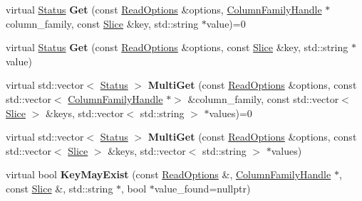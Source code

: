 \begin{DoxyCompactItemize}
\item 
virtual \hyperlink{classrocksdb_1_1Status}{Status} {\bfseries Get} (const \hyperlink{structrocksdb_1_1ReadOptions}{Read\+Options} \&options, \hyperlink{classrocksdb_1_1ColumnFamilyHandle}{Column\+Family\+Handle} $\ast$column\+\_\+family, const \hyperlink{classrocksdb_1_1Slice}{Slice} \&key, std\+::string $\ast$value)=0\hypertarget{classrocksdb_1_1DB_a53885ea9306b14be2385ca8a9e664b5f}{}\label{classrocksdb_1_1DB_a53885ea9306b14be2385ca8a9e664b5f}

\item 
virtual \hyperlink{classrocksdb_1_1Status}{Status} {\bfseries Get} (const \hyperlink{structrocksdb_1_1ReadOptions}{Read\+Options} \&options, const \hyperlink{classrocksdb_1_1Slice}{Slice} \&key, std\+::string $\ast$value)\hypertarget{classrocksdb_1_1DB_ad04ed2bb886fbfb5c97af2dc3e88d8b0}{}\label{classrocksdb_1_1DB_ad04ed2bb886fbfb5c97af2dc3e88d8b0}

\item 
virtual std\+::vector$<$ \hyperlink{classrocksdb_1_1Status}{Status} $>$ {\bfseries Multi\+Get} (const \hyperlink{structrocksdb_1_1ReadOptions}{Read\+Options} \&options, const std\+::vector$<$ \hyperlink{classrocksdb_1_1ColumnFamilyHandle}{Column\+Family\+Handle} $\ast$$>$ \&column\+\_\+family, const std\+::vector$<$ \hyperlink{classrocksdb_1_1Slice}{Slice} $>$ \&keys, std\+::vector$<$ std\+::string $>$ $\ast$values)=0\hypertarget{classrocksdb_1_1DB_a5809d34b7cb788825fc65991c95a2d64}{}\label{classrocksdb_1_1DB_a5809d34b7cb788825fc65991c95a2d64}

\item 
virtual std\+::vector$<$ \hyperlink{classrocksdb_1_1Status}{Status} $>$ {\bfseries Multi\+Get} (const \hyperlink{structrocksdb_1_1ReadOptions}{Read\+Options} \&options, const std\+::vector$<$ \hyperlink{classrocksdb_1_1Slice}{Slice} $>$ \&keys, std\+::vector$<$ std\+::string $>$ $\ast$values)\hypertarget{classrocksdb_1_1DB_a608e457908d203043d7d6756ab58d5ef}{}\label{classrocksdb_1_1DB_a608e457908d203043d7d6756ab58d5ef}

\item 
virtual bool {\bfseries Key\+May\+Exist} (const \hyperlink{structrocksdb_1_1ReadOptions}{Read\+Options} \&, \hyperlink{classrocksdb_1_1ColumnFamilyHandle}{Column\+Family\+Handle} $\ast$, const \hyperlink{classrocksdb_1_1Slice}{Slice} \&, std\+::string $\ast$, bool $\ast$value\+\_\+found=nullptr)\hypertarget{classrocksdb_1_1DB_a771ca74b3c3a772e4f45169180692c06}{}\label{classrocksdb_1_1DB_a771ca74b3c3a772e4f45169180692c06}


\end{DoxyCompactItemize}
